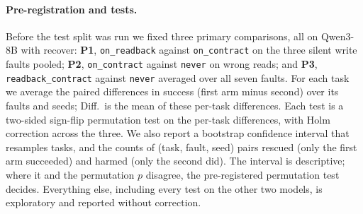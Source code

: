 \paragraph{Pre-registration and tests.} Before the test split was run we fixed three primary
comparisons, all on Qwen3-8B with recover: \textbf{P1}, \texttt{on\_readback} against
\texttt{on\_contract} on the three silent write faults pooled; \textbf{P2}, \texttt{on\_contract}
against \texttt{never} on wrong reads; and \textbf{P3}, \texttt{readback\_contract} against
\texttt{never} averaged over all seven faults. For each task we average the paired differences in
success (first arm minus second) over its faults and seeds; Diff.\ is the mean of these per-task
differences. Each test is a two-sided sign-flip permutation test on the per-task differences, with
Holm correction across the three. We also report a bootstrap confidence interval that resamples tasks,
and the counts of (task, fault, seed) pairs rescued (only the first arm succeeded) and harmed (only the
second did). The interval is descriptive; where it and the permutation $p$ disagree, the pre-registered
permutation test decides. Everything else, including every test on the other two models, is exploratory
and reported without correction.
